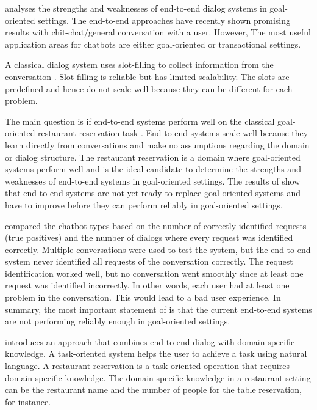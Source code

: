 \citet{bordes2016learning} analyses the strengths and weaknesses of end-to-end dialog systems in goal-oriented settings.
The end-to-end approaches have recently shown promising results with chit-chat/general conversation with a user.
However, The most useful application areas for chatbots are either goal-oriented or transactional settings.

A classical dialog system uses slot-filling to collect information from the conversation \cite{bordes2016learning}.
Slot-filling is reliable but has limited scalability.
The slots are predefined and hence do not scale well because they can be different for each problem. 

The main question is if end-to-end systems perform well on the classical goal-oriented restaurant reservation task \cite{bordes2016learning}.
End-to-end systems scale well because they learn directly from conversations and make no assumptions regarding the domain or dialog structure. 
The restaurant reservation is a domain where goal-oriented systems perform well and is the ideal candidate to determine the strengths and weaknesses of end-to-end systems in goal-oriented settings.
The results of \citet{bordes2016learning} show that end-to-end systems are not yet ready to replace goal-oriented systems and have to improve before they can perform reliably in goal-oriented settings. 

\citet{bordes2016learning} compared the chatbot types based on the number of correctly identified requests (true positives) and the number of dialogs where every request was identified correctly.
Multiple conversations were used to test the system, but the end-to-end system never identified all requests of the conversation correctly.
The request identification worked well, but no conversation went smoothly since at least one request was identified incorrectly.
In other words, each user had at least one problem in the conversation.
This would lead to a bad user experience. 
In summary, the most important statement of \citet{bordes2016learning} is that the current end-to-end systems are not performing reliably enough in goal-oriented settings.

\citet{williams2017hybrid} introduces an approach that combines end-to-end dialog with domain-specific knowledge.
A task-oriented system helps the user to achieve a task using natural language.
A restaurant reservation is a task-oriented operation that requires domain-specific knowledge.
The domain-specific knowledge in a restaurant setting can be the restaurant name and the number of people for the table reservation, for instance. 

